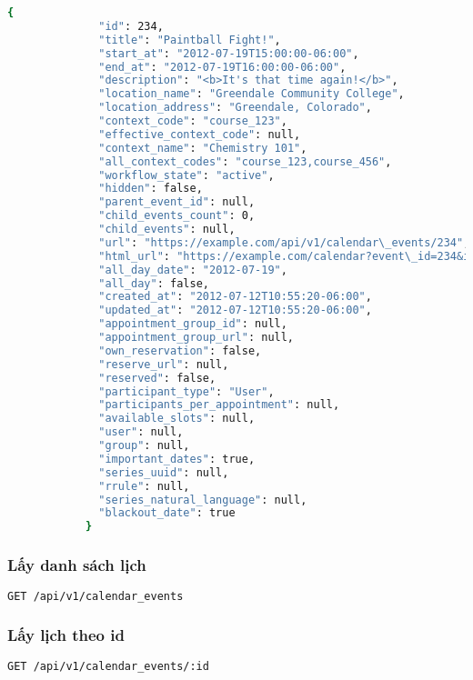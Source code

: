 \documentclass[../Thesis.tex]{subfiles}
\begin{document}
          \begin{lstlisting}[language=bash]
            {
              "id": 234,
              "title": "Paintball Fight!",
              "start_at": "2012-07-19T15:00:00-06:00",
              "end_at": "2012-07-19T16:00:00-06:00",
              "description": "<b>It's that time again!</b>",
              "location_name": "Greendale Community College",
              "location_address": "Greendale, Colorado",
              "context_code": "course_123",
              "effective_context_code": null,
              "context_name": "Chemistry 101",
              "all_context_codes": "course_123,course_456",
              "workflow_state": "active",
              "hidden": false,
              "parent_event_id": null,
              "child_events_count": 0,
              "child_events": null,
              "url": "https://example.com/api/v1/calendar\_events/234",
              "html_url": "https://example.com/calendar?event\_id=234&include\_contexts=course_123",
              "all_day_date": "2012-07-19",
              "all_day": false,
              "created_at": "2012-07-12T10:55:20-06:00",
              "updated_at": "2012-07-12T10:55:20-06:00",
              "appointment_group_id": null,
              "appointment_group_url": null,
              "own_reservation": false,
              "reserve_url": null,
              "reserved": false,
              "participant_type": "User",
              "participants_per_appointment": null,
              "available_slots": null,
              "user": null,
              "group": null,
              "important_dates": true,
              "series_uuid": null,
              "rrule": null,
              "series_natural_language": null,
              "blackout_date": true
            }
          \end{lstlisting}
          \subsubsection{Lấy danh sách lịch}
          \begin{lstlisting}[language=bash]
            GET /api/v1/calendar_events
          \end{lstlisting}

          \subsubsection{Lấy lịch theo id}
          \begin{lstlisting}[language=bash]
            GET /api/v1/calendar_events/:id
          \end{lstlisting}
\end{document}
